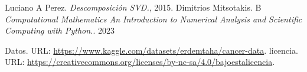\documentclass[a4paper,10pt,twocolumn]{article}
\begin{document}
	





\begin{thebibliography}{99}
	 Luciano A Perez. \emph{Descomposición SVD.}, 2015.
	 Dimitrios Mitsotakis. B \emph{Computational Mathematics An Introduction to Numerical Analysis and Scientific Computing with Python.}. 2023

	 Datos. URL: \href{https://www.kaggle.com/datasets/erdemtaha/cancer-data}
{https://www.kaggle.com/datasets/erdemtaha/cancer-data}.
 licencia. URL: \href{https://creativecommons.org/licenses/by-nc-sa/4.0/bajoestalicencia}
{https://creativecommons.org/licenses/by-nc-sa/4.0/bajoestalicencia}.
\end{thebibliography}


\label{end}
\end{document}
